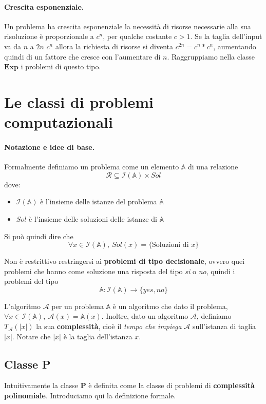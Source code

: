 \documentclass[a4paper]{article}
\theoremstyle{definition}
\newcommand{\Exp}{\mathbf{Exp}}
\newcommand{\p}{\mathbf{P}}
\newcommand{\prob}[1]{\mathbb{#1}}
\newcommand{\instance}[1]{\mathcal{I}(\prob{#1})}
\newcommand{\alg}[1]{\mathcal{#1}}
\newcommand{\compl}[2]{T_\alg{#1}( \vert #2 \vert)}
\begin{document}
			\paragraph{Crescita esponenziale.} Un problema ha crescita esponenziale la necessità di risorse necessarie alla sua risoluzione è proporzionale a $c^n$, per qualche costante $c > 1$. Se la taglia dell'input va da $n$ a  $2n$ $c^n$ allora la richiesta di risorse si diventa $c^{2n} = c^n * c^n$, aumentando quindi di un fattore che cresce con l'aumentare di $n$. Raggruppiamo nella classe $\Exp$ i problemi di questo tipo.
			
			\section{Le classi di problemi computazionali}
			\paragraph{Notazione e idee di base.}
			Formalmente definiamo un problema come un elemento $ \prob{A} $ di una relazione 
			\[ 
				\mathcal{R} \subseteq \instance{A} \times Sol 
			\] 
			dove: 
			\begin{itemize}
				\item $\instance{A}$ è l'insieme delle istanze del problema $\prob{A}$
				\item $Sol$ è l'insieme delle soluzioni delle istanze di $\prob{A}$
			\end{itemize}
			Si può quindi dire che 
			\[ 
				\forall x \in \instance{A},\ Sol(x) = \lbrace \text{Soluzioni di } x \rbrace 
			\]
			
			Non è restrittivo restringersi ai \textbf{problemi di tipo decisionale}, ovvero quei problemi che hanno come soluzione una risposta del tipo \textit{si} o \textit{no}, quindi i problemi del tipo \[ \prob{A} : \instance{A} \to \lbrace yes, no \rbrace \]
			
			
			L'algoritmo $\alg{A}$ per un problema $\prob{A}$ è un algoritmo che dato il problema, $\forall x \in \instance{A},\ \alg{A}(x) = \prob{A}(x)$. Inoltre, dato un algoritmo $ \alg{A} $, definiamo $\compl{A}{x}$ la sua \textbf{complessità}, cioè il \textit{tempo che impiega} $\alg{A}$ sull'istanza di taglia $\vert x \vert$. Notare che $\vert x \vert$ è la taglia dell'istanza $x$.
			
			\subsection{Classe P} 
			Intuitivamente la classe $\p$ è definita come la classe di problemi di \textbf{complessità polinomiale}. Introduciamo qui la definizione formale.
			
\end{document}
